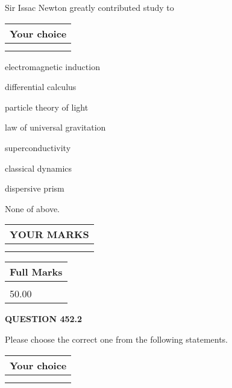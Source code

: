 \documentclass[12pt]{article}
\begin{document}
  
Sir Issac Newton greatly contributed study to
  
  
\noindent\hspace{3.0in} \begin{tabular}{|l|}
\hline
Your choice \\
\hline
 \\ 
 \\ 
\hline
\end{tabular}
  
  
 
 
electromagnetic induction
 
 
differential calculus
 
 
particle theory of light
 
 
law of universal gravitation
 
 
superconductivity
 
 
classical dynamics
 
 
dispersive prism
 
 
 None of above.
 
 
  
\vspace{0.2in}
  
\noindent\begin{tabular}{|l|}
\hline
 YOUR MARKS  \\
\hline
 \\ 
 \\ 
\hline
\end{tabular}
\hspace{0.05in} \begin{tabular}{|l|}
\hline
 Full Marks  \\
\hline
 \\ 
50.00 \\
\hline
\end{tabular}
{\textbf{\Large{QUESTION
452.2 
}}}
  
  
Please choose the correct one from the following statements.
  
  
\noindent\hspace{3.0in} \begin{tabular}{|l|}
\hline
Your choice \\
\hline
 \\ 
 \\ 
\hline
\end{tabular}
  
\end{document}
